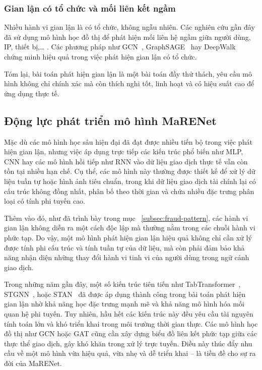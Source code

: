 \subsubsection{Gian lận có tổ chức và mối liên kết ngầm}
Nhiều hành vi gian lận là có tổ chức, không ngẫu nhiên. Các nghiên cứu gần đây đã sử dụng mô hình học đồ thị để phát hiện mối liên hệ ngầm giữa người dùng, IP, thiết bị,… . Các phương pháp như GCN~\cite{dou2020enhancing}, GraphSAGE~\cite{weber2018scalable} hay DeepWalk~\cite{perozzi2014deepwalk} chứng minh hiệu quả trong việc phát hiện gian lận có tổ chức.

Tóm lại, bài toán phát hiện gian lận là một bài toán đầy thử thách, yêu cầu mô hình không chỉ chính xác mà còn thích nghi tốt, linh hoạt và có hiệu suất cao để ứng dụng thực tế.

\subsection{Động lực phát triển mô hình MaRENet}

Mặc dù các mô hình học sâu hiện đại đã đạt được nhiều tiến bộ trong việc phát hiện gian lận, nhưng việc áp dụng trực tiếp các kiến trúc phổ biến như MLP, CNN hay các mô hình hồi tiếp như RNN vào dữ liệu giao dịch thực tế vẫn còn tồn tại nhiều hạn chế. Cụ thể, các mô hình này thường được thiết kế để xử lý dữ liệu tuần tự hoặc hình ảnh tiêu chuẩn, trong khi dữ liệu giao dịch tài chính lại có cấu trúc không đồng nhất, phân bố theo thời gian và chứa nhiều đặc trưng phân loại có tính phi tuyến cao.

Thêm vào đó, như đã trình bày trong mục ~\ref{subsec:fraud-pattern}, các hành vi gian lận không diễn ra một cách độc lập mà thường nằm trong các chuỗi hành vi phức tạp. Do vậy, một mô hình phát hiện gian lận hiệu quả không chỉ cần xử lý được tính phi cấu trúc và tính tuần tự của dữ liệu, mà còn phải đảm bảo khả năng nhận diện những thay đổi hành vi tinh vi của người dùng trong ngữ cảnh giao dịch.

Trong những năm gần đây, một số kiến trúc tiên tiến như TabTransformer~\cite{huang2020tabtransformer}, STGNN~\cite{xie2024stgn}, hoặc STAN~\cite{cheng2020spatio} đã được áp dụng thành công trong bài toán phát hiện gian lận nhờ khả năng học đặc trưng mạnh mẽ và khả năng mô hình hóa mối quan hệ phi tuyến. Tuy nhiên, hầu hết các kiến trúc này đều yêu cầu tài nguyên tính toán lớn và khó triển khai trong môi trường thời gian thực. Các mô hình học đồ thị như GCN hoặc GAT cũng cần xây dựng biểu đồ liên kết phức tạp giữa các thực thể giao dịch, gây khó khăn trong xử lý trực tuyến. Điều này thúc đẩy nhu cầu về một mô hình vừa hiệu quả, vừa nhẹ và dễ triển khai – là tiền đề cho sự ra đời của MaRENet.

